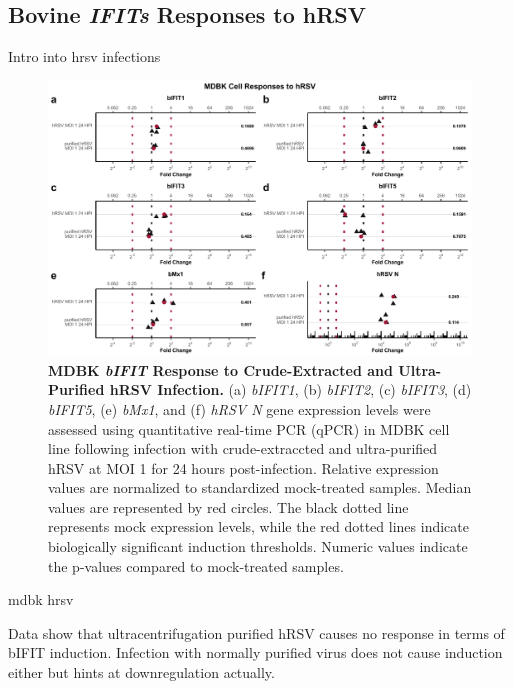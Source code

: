 \subsection{Bovine \textit{IFITs} Responses to hRSV} \label{subsec:Bovine IFITs Responses to hRSV}

Intro into hrsv infections


\begin{figure}
    \centering
    \includegraphics[width=1\linewidth]{07. Chapter 2/Figs/02. Induction/07. mdbk_hrsv.pdf}
    \caption[MDBK \textit{bIFIT} Response to Crude-Extracted and Ultra-Purified hRSV Infection.]{\textbf{MDBK \textit{bIFIT} Response to Crude-Extracted and Ultra-Purified hRSV Infection.} (a) \textit{bIFIT1}, (b) \textit{bIFIT2}, (c) \textit{bIFIT3}, (d) \textit{bIFIT5}, (e) \textit{bMx1}, and (f) \textit{hRSV N} gene expression levels were assessed using quantitative real-time PCR (qPCR) in MDBK cell line following infection with crude-extraccted and ultra-purified hRSV at MOI 1 for 24 hours post-infection. Relative expression values are normalized to standardized mock-treated samples. Median values are represented by red circles. The black dotted line represents mock expression levels, while the red dotted lines indicate biologically significant induction thresholds. Numeric values indicate the p-values compared to mock-treated samples.}
    \label{fig:bIFIT responses to hRSV infection in MDBK}
\end{figure}

mdbk hrsv

Data show that ultracentrifugation purified hRSV causes no response in terms of bIFIT induction. Infection with normally purified virus does not cause induction either but hints at downregulation actually.

